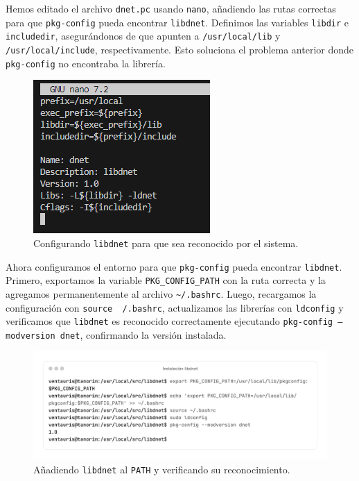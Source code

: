 \documentclass[12pt,a4paper]{report}
\begin{document}
\newpage

Hemos editado el archivo \texttt{dnet.pc} usando \texttt{nano}, añadiendo las rutas correctas para que \texttt{pkg-config} pueda encontrar \texttt{libdnet}. Definimos las variables \texttt{libdir} e \texttt{includedir}, asegurándonos de que apunten a \texttt{/usr/local/lib} y \texttt{/usr/local/include}, respectivamente. Esto soluciona el problema anterior donde \texttt{pkg-config} no encontraba la librería.

\begin{figure}[H]
	\centering
	\includegraphics[scale=1]{instalacion_snort/7.png}
	\caption{Configurando \texttt{libdnet} para que sea reconocido por el sistema.}
\end{figure}

Ahora configuramos el entorno para que \texttt{pkg-config} pueda encontrar \texttt{libdnet}. Primero, exportamos la variable \texttt{PKG\_CONFIG\_PATH} con la ruta correcta y la agregamos permanentemente al archivo \texttt{\~{}/.bashrc}. Luego, recargamos la configuración con \texttt{source ~/.bashrc}, actualizamos las librerías con \texttt{ldconfig} y verificamos que \texttt{libdnet} es reconocido correctamente ejecutando \texttt{pkg-config --modversion dnet}, confirmando la versión instalada.

\begin{figure}[H]
	\centering
	\includegraphics[scale=0.12]{instalacion_snort/8-8.png}
	\caption{Añadiendo \texttt{libdnet} al \texttt{PATH} y verificando su reconocimiento.}
\end{figure}
\end{document}
